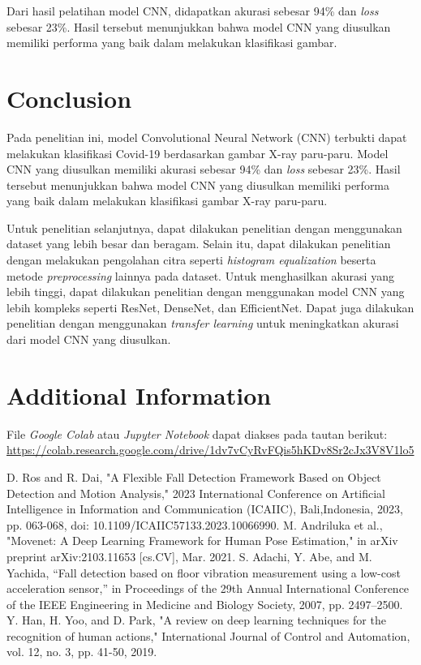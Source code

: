 \documentclass[conference]{IEEEtran}
\begin{document}
Dari hasil pelatihan model CNN, didapatkan akurasi sebesar 94\% dan \textit{loss} sebesar 23\%. Hasil tersebut menunjukkan bahwa model CNN yang diusulkan memiliki performa yang baik dalam melakukan klasifikasi gambar.

\section{Conclusion}
Pada penelitian ini, model Convolutional Neural Network (CNN) terbukti dapat melakukan klasifikasi Covid-19 berdasarkan gambar X-ray paru-paru. Model CNN yang diusulkan memiliki akurasi sebesar 94\% dan \textit{loss} sebesar 23\%. Hasil tersebut menunjukkan bahwa model CNN yang diusulkan memiliki performa yang baik dalam melakukan klasifikasi gambar X-ray paru-paru. 

Untuk penelitian selanjutnya, dapat dilakukan penelitian dengan menggunakan dataset yang lebih besar dan beragam. Selain itu, dapat dilakukan penelitian dengan melakukan pengolahan citra seperti \textit{histogram equalization} beserta metode \textit{preprocessing} lainnya pada dataset. Untuk menghasilkan akurasi yang lebih tinggi, dapat dilakukan penelitian dengan menggunakan model CNN yang lebih kompleks seperti ResNet, DenseNet, dan EfficientNet. Dapat juga dilakukan penelitian dengan menggunakan \textit{transfer learning} untuk meningkatkan akurasi dari model CNN yang diusulkan.

\section{Additional Information}
File \textit{Google Colab} atau \textit{Jupyter Notebook} dapat diakses pada tautan berikut: \url{https://colab.research.google.com/drive/1dv7vCyRvFQis5hKDv8Sr2cJx3V8V1lo5}

\begin{thebibliography}{00}
 D. Ros and R. Dai, "A Flexible Fall Detection Framework Based on Object Detection and Motion Analysis," 2023 International Conference on Artificial Intelligence in Information and Communication (ICAIIC), Bali,Indonesia, 2023, pp. 063-068, doi: 10.1109/ICAIIC57133.2023.10066990.
 M. Andriluka et al., "Movenet: A Deep Learning Framework for Human Pose Estimation," in arXiv preprint arXiv:2103.11653 [cs.CV], Mar. 2021.
 S. Adachi, Y. Abe, and M. Yachida, “Fall detection based on floor vibration measurement using a low-cost acceleration sensor,” in Proceedings of the 29th Annual International Conference of the IEEE Engineering in Medicine and Biology Society, 2007, pp. 2497–2500.
 Y. Han, H. Yoo, and D. Park, "A review on deep learning techniques for the recognition of human actions," International Journal of Control and Automation, vol. 12, no. 3, pp. 41-50, 2019.

\end{thebibliography}
\end{document}
